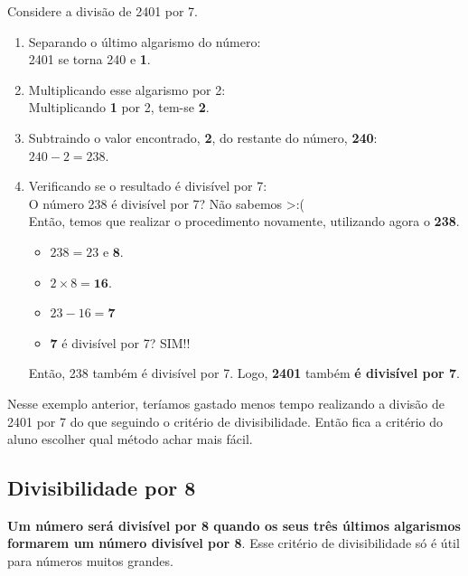 \begin{exemplo}
    Considere a divisão de 2401 por 7.

    \begin{enumerate}
        \item Separando o último algarismo do número:\\
        2401 se torna 240 e \textbf{1}.
        \item Multiplicando esse algarismo por 2:\\
        Multiplicando \textbf{1} por 2, tem-se \textbf{2}.
        \item Subtraindo o valor encontrado, \textbf{2}, do restante do número, \textbf{240}:\\
        \(240-2=238\).
        \item Verificando se o resultado é divisível por 7:\\
        O número 238 é divisível por 7? Não sabemos >:(\\

        Então, temos que realizar o procedimento novamente, utilizando agora o \textbf{238}.

        \begin{itemize}
            \item $238 = 23 \text{ e } \textbf{8}.$
            \item $2\times8 = \textbf{16}$.
            \item $23 -16=\textbf{7}$
            \item \textbf{7} é divisível por 7? SIM!!
        \end{itemize}

        Então, 238 também é divisível por 7. Logo, \textbf{2401} também \textbf{é divisível por 7}.
    \end{enumerate}
\end{exemplo}

Nesse exemplo anterior, teríamos gastado menos tempo realizando a divisão de 2401 por 7 do que seguindo o critério de divisibilidade. Então fica a critério do aluno escolher qual método achar mais fácil.

\subsection{Divisibilidade por 8}

\textbf{Um número será divisível por 8 quando os seus três últimos algarismos formarem um número divisível por 8}. Esse critério de divisibilidade só é útil para números muitos grandes.

